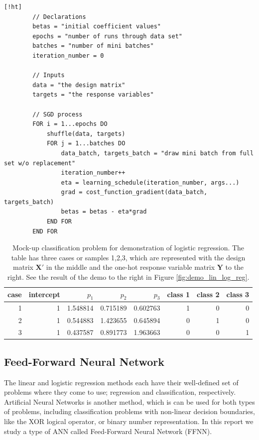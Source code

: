 \documentclass[]{article}
\begin{document}
\begin{minipage}{\linewidth}
	\begin{lstlisting}[caption={Stochastic Gradient Descent algorithm. Cost function gradients and learning schedules may be defined independently of the implementation of SGD. This implementation runs for \lstinline|epochs*batches| iterations, and does not sense if or when it converges.},label={lst:sgd}] [!ht]
		// Declarations
		betas = "initial coefficient values"
		epochs = "number of runs through data set"
		batches = "number of mini batches"
		iteration_number = 0
		
		// Inputs
		data = "the design matrix"
		targets = "the response variables"
	
		// SGD process	
		FOR i = 1...epochs DO
			shuffle(data, targets)
			FOR j = 1...batches DO
				data_batch, targets_batch = "draw mini batch from full set w/o replacement"
				iteration_number++
				eta = learning_schedule(iteration_number, args...)
				grad = cost_function_gradient(data_batch, targets_batch)
				betas = betas - eta*grad
			END FOR
		END FOR
	\end{lstlisting}
\end{minipage}

\begin{table}[!ht]
	\caption{Mock-up classification problem for demonstration of logistic regression. The table has three cases or samples 1,2,3, which are represented with the design matrix $\mathbf{X}'$ in the middle and the one-hot response variable matrix $\mathbf{Y}$ to the right. See the result of the demo to the right in Figure \ref{fig:demo_lin_log_reg}.}
	\label{tab:logreg-demo}
	\begin{center}
		\begin{tabular}{r|rrrr|rrr}
			\toprule
			case &  intercept &     $p_1$ &     $p_2$ &     $p_3$ &  class 1 &  class 2 &  class 3 \\
			\midrule
			1 &          1 &  1.548814 &  0.715189 &  0.602763 &        1 &        0 &        0 \\
			2 &          1 &  0.544883 &  1.423655 &  0.645894 &        0 &        1 &        0 \\
			3 &          1 &  0.437587 &  0.891773 &  1.963663 &        0 &        0 &        1 \\
			\bottomrule
		\end{tabular}
	\end{center}
\end{table}


\subsection{Feed-Forward Neural Network}
The linear and logistic regression methods each have their well-defined set of problems where they come to use; regression and classification, respectively. Artificial Neural Networks is another method, which is can be used for both types of problems, including classification problems with non-linear decision boundaries, like the XOR logical operator, or binary number representation. In this report we study a type of ANN called Feed-Forward Neural Network (FFNN).
\end{document}
